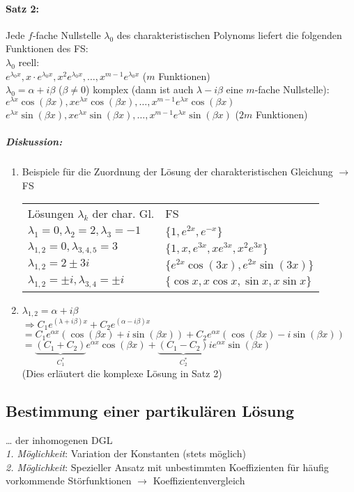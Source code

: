 \paragraph{Satz 2:} Jede $f$-fache Nullstelle $\lambda_0$ des charakteristischen Polynoms liefert die folgenden Funktionen des FS:\\
$\lambda_0$ reell:\medskip\\
$e^{\lambda_0 x}, x\cdot e^{\lambda_0x},x^2e^{\lambda_0x},\dots,x^{m-1}e^{\lambda_0x}$ ($m$ Funktionen)\\
$\lambda_0=\alpha + i\beta$ ($\beta \not = 0$) komplex (dann ist auch $\lambda - i\beta$ eine $m$-fache Nullstelle):\medskip\\
$e^{\lambda x }\cos (\beta x), xe^{\lambda x}\cos (\beta x), \dots, x^{m-1}e^{\lambda x} \cos (\beta x)$\\
$e^{\lambda x} \sin (\beta x), xe^{\lambda x}\sin (\beta x), \dots, x^{m-1}e^{\lambda x} \sin (\beta x)$ ($2m$ Funktionen)
\subparagraph{Diskussion:}
\begin{enumerate}
\item Beispiele für die Zuordnung der Lösung der charakteristischen Gleichung $\to$ FS\\
\begin{tabular}{l | l}
Lösungen $\lambda_k$ der char. Gl. & FS\\
$\lambda_1=0,\lambda_2=2, \lambda_3 = -1$ & $\{1, e^{2x},e^{-x}\}$\\
\hline 
$\lambda_{1,2}=0, \lambda_{3,4,5}=3$& $\{1, x, e^{3x}, xe^{3x},x^2e^{3x}\}$\\
\hline
$\lambda_{1,2}=2\pm 3i$ & $\{e^{2x}\cos (3x), e^{2x} \sin (3x) \}$\\
\hline
$\lambda_{1,2}=\pm i, \lambda_{3,4}=\pm i$ & $\{ \cos x, x \cos x, \sin x, x \sin x \}$
\end{tabular}
\item $\lambda_{1,2}=\alpha + i \beta$\\
$\Rightarrow C_1 e^{(\lambda + i \beta)x }+C_2e^{(\alpha - i \beta)x}$\\
$=C_1 e^{\alpha x} (\cos (\beta x) + i \sin (\beta x) ) + C_2 e^{\alpha x}(\cos (\beta x) - i \sin (\beta x))$\\
$=\underbrace{(C_1+C_2)}_{C_1^*} e^{\alpha x} \cos (\beta x) + \underbrace{(C_1 - C_2)}_{C_2^*} i e^{\alpha x} \sin (\beta x)$\\
(Dies erläutert die komplexe Lösung in Satz 2)
\end{enumerate}
\subsection*{Bestimmung einer partikulären Lösung} … der inhomogenen DGL\\
\emph{1. Möglichkeit}: Variation der Konstanten (stets möglich)\\
\emph{2. Möglichkeit}: Spezieller Ansatz mit unbestimmten Koeffizienten für häufig vorkommende Störfunktionen $\to$ Koeffizientenvergleich
